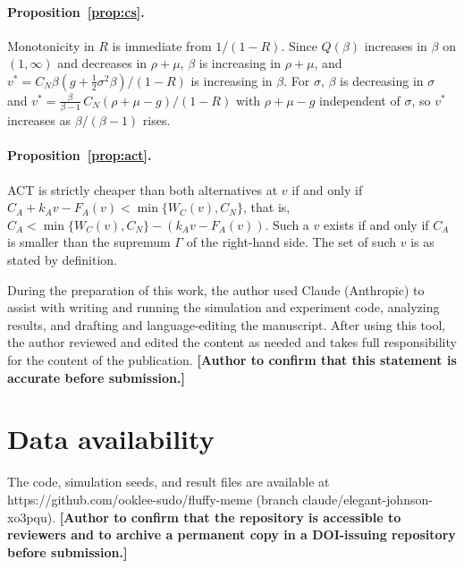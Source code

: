 \documentclass[acmsmall,review]{acmart}
\begin{document}
\paragraph{Proposition~\ref{prop:cs}.} Monotonicity in $R$ is immediate from $1/(1-R)$. Since $Q(\beta)$ increases in
$\beta$ on $(1,\infty)$ and decreases in $\rho+\mu$, $\beta$ is increasing in $\rho+\mu$, and
$v^*=C_N\beta(g+\tfrac12\sigma^2\beta)/(1-R)$ is increasing in $\beta$. For $\sigma$, $\beta$ is decreasing in $\sigma$ and
$v^*=\frac{\beta}{\beta-1}\,C_N(\rho+\mu-g)/(1-R)$ with $\rho+\mu-g$ independent of $\sigma$, so $v^*$ increases as
$\beta/(\beta-1)$ rises.

\paragraph{Proposition~\ref{prop:act}.} ACT is strictly cheaper than both alternatives at $v$ if and only if
$C_A+k_Av-F_A(v)<\min\{W_C(v),C_N\}$, that is, $C_A<\min\{W_C(v),C_N\}-(k_Av-F_A(v))$. Such a $v$ exists if and only if
$C_A$ is smaller than the supremum $\Gamma$ of the right-hand side. The set of such $v$ is as stated by definition.


\begin{acks}
During the preparation of this work, the author used Claude (Anthropic) to assist with writing and running the simulation and experiment code, analyzing results, and drafting and language-editing the manuscript. After using this tool, the author reviewed and edited the content as needed and takes full responsibility for the content of the publication. \textbf{[Author to confirm that this statement is accurate before submission.]}
\end{acks}

\section*{Data availability}
The code, simulation seeds, and result files are available at https://github.com/ooklee-sudo/fluffy-meme (branch claude/elegant-johnson-xo3pqu). \textbf{[Author to confirm that the repository is accessible to reviewers and to archive a permanent copy in a DOI-issuing repository before submission.]}



\end{document}
